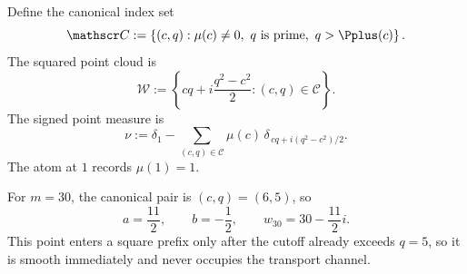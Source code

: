 Define the canonical index set
\begin{equation}
 \mathscr C
 :=
 \left\{
 (c,q):
 \mu(c)\ne0,
 \ q\text{ is prime},
 \ q>\Pplus(c)
 \right\}.
 \label{eq:canonical-index}
\end{equation}
The squared point cloud is
\begin{equation}
 \mathscr W
 :=
 \left\{
 cq+i\frac{q^2-c^2}{2}:(c,q)\in\mathscr C
 \right\}.
 \label{eq:canonical-cloud}
\end{equation}
The signed point measure is
\begin{equation}
 \nu
 :=
 \delta_1
 -
 \sum_{(c,q)\in\mathscr C}
 \mu(c)\,
 \delta_{\,cq+i(q^2-c^2)/2}.
 \label{eq:signed-measure}
\end{equation}
The atom at $1$ records $\mu(1)=1$.

\begin{example}
For $m=30$, the canonical pair is $(c,q)=(6,5)$, so
\[
 a=\frac{11}{2},
 \qquad
 b=-\frac12,
 \qquad
 w_{30}=30-\frac{11}{2}i.
\]
This point enters a square prefix only after the cutoff already exceeds $q=5$, so it is smooth immediately and never occupies the transport channel.
\end{example}

